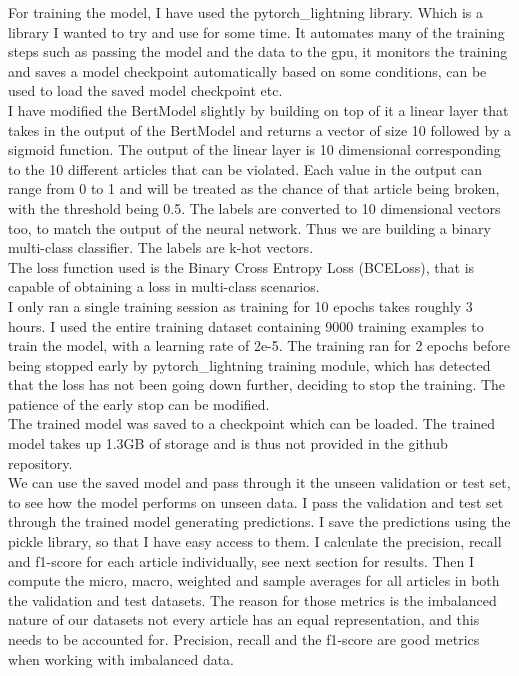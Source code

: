 \documentclass{article}
\begin{document}
For training the model, I have used the pytorch\_lightning library.
Which is a library I wanted to try and use for some time.
It automates many of the training steps such as passing the model
and the data to the gpu, it monitors the training and saves
a model checkpoint automatically based on some conditions, can be used
to load the saved model checkpoint etc.
\\

I have modified the BertModel slightly by building on top of it
a linear layer that takes in the output of the BertModel and returns
a vector of size 10 followed by a sigmoid function. The output of the linear
layer is
10 dimensional corresponding to the 10 different articles that can
be violated. Each value in the output can range from 0 to 1 and
will be treated as the chance of that article being broken, with
the threshold being 0.5.
The labels are converted to 10 dimensional vectors too, to 
match the output of the neural network. Thus we are building a
binary multi-class classifier. The labels are k-hot vectors.\\

The loss function used is the Binary Cross Entropy Loss (BCELoss),
that is capable of obtaining a loss in multi-class scenarios.\\

I only ran a single training session as training for 10 epochs takes
roughly 3 hours. I used the entire training dataset containing 9000
training examples to train the model, with a learning rate
of 2e-5. 
The training ran for 2 epochs before being stopped
early by pytorch\_lightning training module, which has detected that
the loss has not been going down further, deciding to stop the
training. The patience of the early stop can be modified.\\

The trained model was saved to a checkpoint which can be loaded.
The trained model takes up 1.3GB of storage and is thus not 
provided in the github repository. \\

We can use the saved model and pass through it the unseen validation
or test set, to see how the model performs on unseen data.
I pass the validation and test set through the trained model
generating predictions. I save the predictions using the pickle
library, so that I have easy access to them.
I calculate the precision, recall and f1-score for each article 
individually, see next section for results. Then I compute the 
micro, macro, weighted and sample averages for all articles
in both the validation and test datasets.
The reason for those metrics is the imbalanced nature of our datasets
not every article has an equal representation, and this needs to
be accounted for. Precision, recall and the f1-score are good
metrics when working with imbalanced data.
\end{document}
